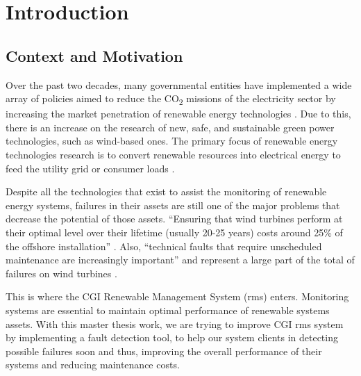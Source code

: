 


\chapter{Introduction}
\label{cha:introduction}

\section{Context and Motivation} 
\label{sub:if_you_use_this_template} 

Over the past two decades, many governmental entities have implemented a wide array of policies aimed to reduce the CO\textsubscript{2} missions of the electricity sector by increasing the market penetration of renewable energy technologies \cite{OLD_3_GENERAL}. Due to this, there is an increase on the research of new, safe, and sustainable green power technologies, such as wind-based ones. The primary focus of renewable energy technologies research is to convert renewable resources into electrical energy to feed the utility grid or consumer loads \cite{OLD_1_SOLAR}.

Despite all the technologies that exist to assist the monitoring of renewable energy systems, failures in their assets are still one of the major problems that decrease the potential of those assets. “Ensuring that wind turbines perform at their optimal level over their lifetime (usually 20-25 years) costs around 25\% of the offshore installation” \cite{OLD_15_WIND}. Also, “technical faults that require unscheduled maintenance are increasingly important” and represent a large part of the total of failures on wind turbines \cite{OLD_18_WIND}.

This is where the CGI Renewable Management System (\acrshort{rms}) enters. Monitoring systems are essential to maintain optimal performance of renewable systems assets. With this master thesis work, we are trying to improve CGI \acrshort{rms} system by implementing a fault detection tool, to help our system clients in detecting possible failures soon and thus, improving the overall performance of their systems and reducing maintenance costs.


